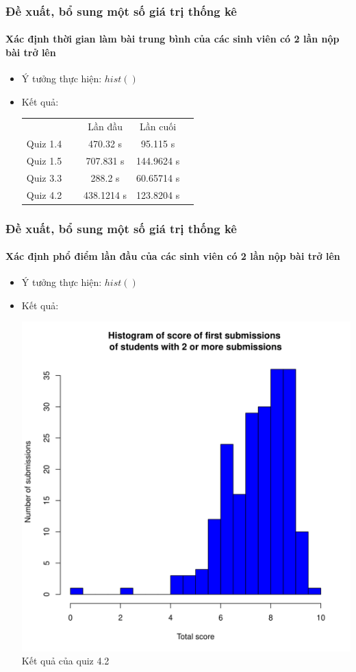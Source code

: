 \documentclass[english,10pt,table]{beamer}
\begin{document}
\frame
{
\frametitle{Đề xuất, bổ sung một số giá trị thống kê}
\framesubtitle{Xác định thời gian làm bài trung bình của các sinh viên có 2 lần nộp bài trở lên}
\begin{itemize}
    \item Ý tưởng thực hiện: $hist()$
    \item Kết quả:\\
    \begin{center}
        \begin{tabular}{l l c c c} 
             & & Lần đầu & Lần cuối\\
             Quiz 1.4 & $\;$ & 470.32 s & 95.115 s\\
             Quiz 1.5 & $\;$ & 707.831 s & 144.9624 s\\
             Quiz 3.3 & $\;$ & 288.2 s & 60.65714 s\\
             Quiz 4.2 & $\;$ & 438.1214 s & 123.8204 s
        \end{tabular}
    \end{center}
\end{itemize}
}

\frame
{
\frametitle{Đề xuất, bổ sung một số giá trị thống kê}
\framesubtitle{Xác định phổ điểm lần đầu của các sinh viên có 2 lần nộp bài trở lên}
\begin{itemize}
    \item Ý tưởng thực hiện: $hist()$
    \item Kết quả:\\
    \begin{center}
        \includegraphics[width = 6 cm]{Images/img12-6-4.png}\\
        Kết quả của quiz 4.2
    \end{center}
\end{itemize}
}
\end{document}
